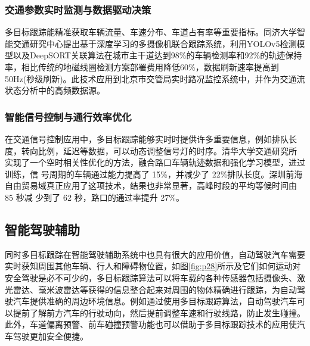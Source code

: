 \subsubsection{交通参数实时监测与数据驱动决策}

多目标跟踪能精准获取车辆流量、车速分布、车道占有率等重要指标。同济大学智能交通研究中心\cite{tongji2022visual}提出基于深度学习的多摄像机联合跟踪系统，利用YOLOv5检测模型以及DeepSORT关联算法在城市主干道达到98\%的车辆检测率和92\%的轨迹保持率，相比传统的地磁线圈检测方案部署费用降低60\%，数据刷新速率提高到50Hz(秒级刷新)。此技术应用到北京市交管局实时路况监控系统中，并作为交通流状态分析中的高频数据源。





\subsubsection{智能信号控制与通行效率优化}


在交通信号控制应用中，多目标跟踪能够实时时提供许多重要信息，例如排队长度，转向比例，延迟等数据，可以动态调整信号灯的时序。清华大学交通研究所 \cite{qinghua2021optimization} 实现了一个空时相关性优化的方法，融合路口车辆轨迹数据和强化学习模型，进过训练，信 号周期的车辆通过能力提高了 15\%，并减少了 22\%排队长度。深圳前海自由贸易域真正应用了这项技术，结果也非常显著，高峰时段的平均等候时间由 85 秒减 少到了 62 秒，路口的通过率提升 27\%。






\subsection{智能驾驶辅助}


同时多目标跟踪在智能驾驶辅助系统中也具有很大的应用价值，自动驾驶汽车需要实时获知周围其他车辆、行人和障碍物位置，如图\ref{fig:p28}所示及它们如何运动对安全驾驶是必不可少的，多目标跟踪算法可以将车载的各种传感器包括摄像头、激光雷达、毫米波雷达等获得的信息整合起来对周围的物体精确进行跟踪，为自动驾驶汽车提供准确的周边环境信息。例如通过使用多目标跟踪算法，自动驾驶汽车可以提前了解前方汽车的行驶动向，然后提前调整车速和行驶线路，防止发生碰撞。此外，车道偏离预警、前车碰撞预警功能也可以借助于多目标跟踪技术的应用使汽车驾驶更加安全便捷。




